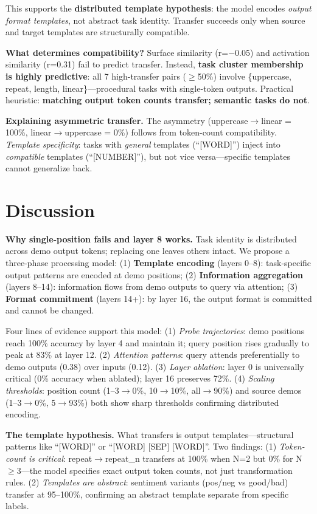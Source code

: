 \documentclass[sigconf,anonymous]{acmart}
\begin{document}
This supports the \textbf{distributed template hypothesis}: the model encodes \emph{output format templates}, not abstract task identity. Transfer succeeds only when source and target templates are structurally compatible.

\textbf{What determines compatibility?} Surface similarity (r=$-$0.05) and activation similarity (r=0.31) fail to predict transfer. Instead, \textbf{task cluster membership is highly predictive}: all 7 high-transfer pairs ($\geq$50\%) involve \{uppercase, repeat, length, linear\}---procedural tasks with single-token outputs. Practical heuristic: \textbf{matching output token counts transfer; semantic tasks do not}.

\textbf{Explaining asymmetric transfer.} The asymmetry (uppercase$\to$linear = 100\%, linear$\to$up\-per\-case = 0\%) follows from token-count compatibility. \emph{Template specificity}: tasks with \emph{general} templates (``[WORD]'') inject into \emph{compatible} templates (``[NUMBER]''), but not vice versa---specific templates cannot generalize back.

\section{Discussion}

\textbf{Why single-position fails and layer 8 works.}
Task identity is distributed across demo output tokens; replacing one leaves others intact. We propose a three-phase processing model: (1) \textbf{Template encoding} (layers 0--8): task-specific output patterns are encoded at demo positions; (2) \textbf{Information aggregation} (layers 8--14): information flows from demo outputs to query via attention; (3) \textbf{Format commitment} (layers 14+): by layer 16, the output format is committed and cannot be changed.

Four lines of evidence support this model: (1) \emph{Probe trajectories}: demo positions reach 100\% accuracy by layer 4 and maintain it; query position rises gradually to peak at 83\% at layer 12. (2) \emph{Attention patterns}: query attends preferentially to demo outputs (0.38) over inputs (0.12). (3) \emph{Layer ablation}: layer 0 is universally critical (0\% accuracy when ablated); layer 16 preserves 72\%. (4) \emph{Scaling thresholds}: position count (1--3$\to$0\%, 10$\to$10\%, all$\to$90\%) and source demos (1--3$\to$0\%, 5$\to$93\%) both show sharp thresholds confirming distributed encoding.

\textbf{The template hypothesis.}
What transfers is output templates---structural patterns like ``[WORD]'' or ``[WORD] [SEP] [WORD]''. Two findings: (1) \emph{Token-count is critical}: repeat$\to$repeat\_n transfers at 100\% when N=2 but 0\% for N$\geq$3---the model specifies exact output token counts, not just transformation rules. (2) \emph{Templates are abstract}: sentiment variants (pos/neg vs good/bad) transfer at 95--100\%, confirming an abstract template separate from specific labels.
\end{document}
